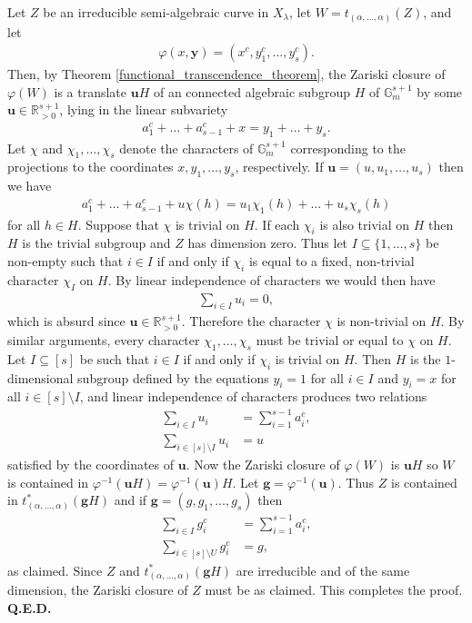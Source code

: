 \documentclass[9pt]{amsart}
\theoremstyle{my_theorem_style}
\numberwithin{definition}{section}
\renewenvironment{proof}{\noindent {\textbf{Proof.}}}{\\\textbf{Q.E.D.}}
\newcommand{\G}{\mathbb{G}}
\renewcommand{\phi}{\varphi}
\newcommand{\R}{\mathbb{R}}
\renewcommand{\vec}[1]{\bm{#1}}
\begin{document}
\begin{proof}
    Let $Z$ be an irreducible semi-algebraic curve in $X_\lambda$, let $W = t_{(\alpha, \dots, \alpha)}(Z)$, and let
    \begin{align*}
        \phi(x, \vec{y}) = (x^c, y_1^c, \dots, y_s^c).
    \end{align*}
    Then, by Theorem \ref{functional_transcendence_theorem}, the Zariski closure of $\phi(W)$ is a translate $\vec{u} H$ of an connected algebraic subgroup $H$ of $\G_m^{s + 1}$ by some $\vec{u} \in \R_{>0}^{s + 1}$, lying in the linear subvariety
    \begin{align*}
        a_1^c + \dots + a_{s - 1}^c + x =
        y_1 + \dots + y_s.
    \end{align*}
    Let $\chi$ and $\chi_1, \dots, \chi_s$ denote the characters of $\G_m^{s + 1}$ corresponding to the projections to the coordinates $x, y_1, \dots, y_s$, respectively. If $\vec{u} = (u, u_1, \dots, u_s)$ then we have
    \begin{align*}
        a_1^c + \dots + a_{s - 1}^c + u\chi(h) =
        u_1\chi_1(h) + \dots + u_s\chi_s(h)
    \end{align*}
    for all $h \in H$. Suppose that $\chi$ is trivial on $H$. If each $\chi_i$ is also trivial on $H$ then $H$ is the trivial subgroup and $Z$ has dimension zero. Thus let $I \subseteq \{1, \dots, s\}$ be non-empty such that $i \in I$ if and only if $\chi_i$ is equal to a fixed, non-trivial character $\chi_I$ on $H$. By linear independence of characters we would then have
    \begin{align*}
        \sum_{i \in I} u_i = 0,
    \end{align*}
    which is absurd since $\vec{u} \in \R_{>0}^{s + 1}$. Therefore the character $\chi$ is non-trivial on $H$. By similar arguments, every character $\chi_1, \dots, \chi_s$ must be trivial or equal to $\chi$ on $H$. Let $I \subseteq [s]$ be such that $i \in I$ if and only if $\chi_i$ is trivial on $H$. Then $H$ is the $1$-dimensional subgroup defined by the equations $y_i = 1$ for all $i \in I$ and $y_i = x$ for all $i \in [s] \setminus I$, and linear independence of characters produces two relations
    \begin{align*}
        \sum_{i \in I} u_i &= \sum_{i = 1}^{s - 1} a_i^c, \\
        \sum_{i \in [s] \setminus I} 
        u_i &= u
    \end{align*}
    satisfied by the coordinates of $\vec{u}$. Now the Zariski closure of $\phi(W)$ is $\vec{u} H$ so $W$ is contained in $\phi^{-1}(\vec{u} H) = \phi^{-1}(\vec{u})H$. Let $\vec{g} = \phi^{-1}(\vec{u})$. Thus $Z$ is contained in $t_{(\alpha, \dots, \alpha)}^* (\vec{g}H)$ and if $\vec{g} = (g, g_1, \dots, g_s)$ then
    \begin{align*}
        \sum_{i \in I} g_i^c &= \sum_{i = 1}^{s - 1} a_i^c, \\
        \sum_{i \in [s] \setminus U} g_i^c &= g,
    \end{align*}
    as claimed. Since $Z$ and $t_{(\alpha, \dots, \alpha)}^* (\vec{g} H)$ are irreducible and of the same dimension, the Zariski closure of $Z$ must be as claimed. This completes the proof.
\end{proof}
\end{document}
